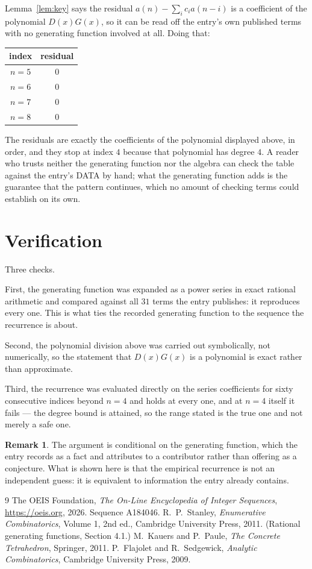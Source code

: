 \documentclass[11pt,a4paper]{article}
\theoremstyle{plain}
\theoremstyle{definition}
\newtheorem{remark}[theorem]{Remark}
\begin{document}
Lemma~\ref{lem:key} says the residual $a(n)-\sum_ic_ia(n-i)$ is a coefficient of the
polynomial $D(x)G(x)$, so it can be read off the entry's own published terms with no
generating function involved at all. Doing that:
\begin{center}
\begin{tabular}{cc}
index & residual \\ \hline
$n=5$ & $0$ \\
$n=6$ & $0$ \\
$n=7$ & $0$ \\
$n=8$ & $0$
\end{tabular}
\end{center}
The residuals are exactly the coefficients of the polynomial displayed above, in order, and
they stop at index $4$ because that polynomial has degree $4$. A reader who trusts
neither the generating function nor the algebra can check the table against the entry's DATA
by hand; what the generating function adds is the guarantee that the pattern continues, which
no amount of checking terms could establish on its own.

\section{Verification}

Three checks.

First, the generating function was expanded as a power series in exact rational arithmetic and
compared against all $31$ terms the entry publishes: it reproduces every one. This is
what ties the recorded generating function to the sequence the recurrence is about.

Second, the polynomial division above was carried out symbolically, not numerically, so the
statement that $D(x)G(x)$ is a polynomial is exact rather than approximate.

Third, the recurrence was evaluated directly on the series coefficients for sixty consecutive
indices beyond $n=4$ and holds at every one, and at $n=4$ itself it fails --- the
degree bound is attained, so the range stated is the true one and not merely a safe one.

\begin{remark}
The argument is conditional on the generating function, which the entry records as a fact and
attributes to a contributor rather than offering as a conjecture. What is shown here is that
the empirical recurrence is not an independent guess: it is equivalent to information the
entry already contains.
\end{remark}

\begin{thebibliography}{9}
 The OEIS Foundation, \emph{The On-Line Encyclopedia of Integer
Sequences}, \url{https://oeis.org}, 2026. Sequence A184046.
 R.~P.~Stanley, \emph{Enumerative Combinatorics}, Volume 1, 2nd ed.,
Cambridge University Press, 2011. (Rational generating functions, Section 4.1.)
 M.~Kauers and P.~Paule, \emph{The Concrete Tetrahedron}, Springer, 2011.
 P.~Flajolet and R.~Sedgewick, \emph{Analytic Combinatorics}, Cambridge
University Press, 2009.
\end{thebibliography}
\end{document}
